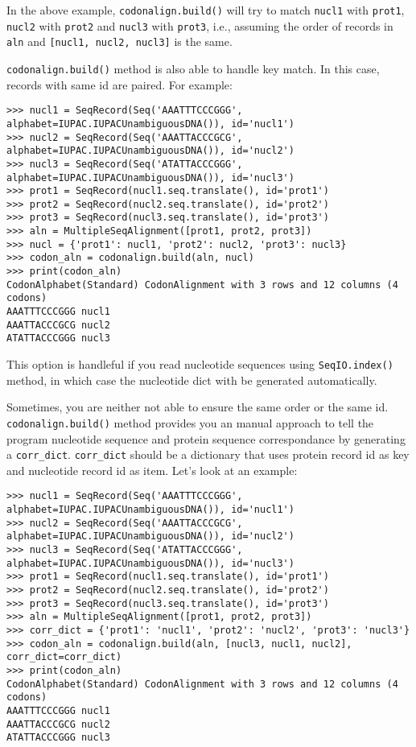 In the above example, \verb|codonalign.build()| will try to match
\texttt{nucl1} with \texttt{prot1}, \texttt{nucl2} with \texttt{prot2}
and \texttt{nucl3} with \texttt{prot3}, i.e., assuming the order of
records in \texttt{aln} and \texttt{{[}nucl1, nucl2, nucl3{]}} is the
same.

\verb|codonalign.build()| method is also able to handle key match. In
this case, records with same id are paired. For example:

\begin{verbatim}
>>> nucl1 = SeqRecord(Seq('AAATTTCCCGGG', alphabet=IUPAC.IUPACUnambiguousDNA()), id='nucl1')
>>> nucl2 = SeqRecord(Seq('AAATTACCCGCG', alphabet=IUPAC.IUPACUnambiguousDNA()), id='nucl2')
>>> nucl3 = SeqRecord(Seq('ATATTACCCGGG', alphabet=IUPAC.IUPACUnambiguousDNA()), id='nucl3')
>>> prot1 = SeqRecord(nucl1.seq.translate(), id='prot1')
>>> prot2 = SeqRecord(nucl2.seq.translate(), id='prot2')
>>> prot3 = SeqRecord(nucl3.seq.translate(), id='prot3')
>>> aln = MultipleSeqAlignment([prot1, prot2, prot3])
>>> nucl = {'prot1': nucl1, 'prot2': nucl2, 'prot3': nucl3}
>>> codon_aln = codonalign.build(aln, nucl)
>>> print(codon_aln)
CodonAlphabet(Standard) CodonAlignment with 3 rows and 12 columns (4 codons)
AAATTTCCCGGG nucl1
AAATTACCCGCG nucl2
ATATTACCCGGG nucl3
\end{verbatim}

This option is handleful if you read nucleotide sequences using
\verb|SeqIO.index()| method, in which case the nucleotide dict with be
generated automatically.

Sometimes, you are neither not able to ensure the same order or the same
id. \verb|codonalign.build()| method provides you an manual approach to
tell the program nucleotide sequence and protein sequence correspondance
by generating a \texttt{corr\_dict}. \texttt{corr\_dict} should be a
dictionary that uses protein record id as key and nucleotide record id
as item. Let's look at an example:

\begin{verbatim}
>>> nucl1 = SeqRecord(Seq('AAATTTCCCGGG', alphabet=IUPAC.IUPACUnambiguousDNA()), id='nucl1')
>>> nucl2 = SeqRecord(Seq('AAATTACCCGCG', alphabet=IUPAC.IUPACUnambiguousDNA()), id='nucl2')
>>> nucl3 = SeqRecord(Seq('ATATTACCCGGG', alphabet=IUPAC.IUPACUnambiguousDNA()), id='nucl3')
>>> prot1 = SeqRecord(nucl1.seq.translate(), id='prot1')
>>> prot2 = SeqRecord(nucl2.seq.translate(), id='prot2')
>>> prot3 = SeqRecord(nucl3.seq.translate(), id='prot3')
>>> aln = MultipleSeqAlignment([prot1, prot2, prot3])
>>> corr_dict = {'prot1': 'nucl1', 'prot2': 'nucl2', 'prot3': 'nucl3'}
>>> codon_aln = codonalign.build(aln, [nucl3, nucl1, nucl2], corr_dict=corr_dict)
>>> print(codon_aln)
CodonAlphabet(Standard) CodonAlignment with 3 rows and 12 columns (4 codons)
AAATTTCCCGGG nucl1
AAATTACCCGCG nucl2
ATATTACCCGGG nucl3
\end{verbatim}

